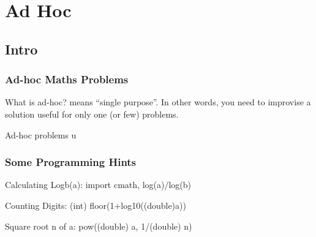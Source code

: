 \documentclass{beamer}
\begin{document}
\section{Ad Hoc}
\subsection{Intro}
\begin{frame}
  \frametitle{Ad-hoc Maths Problems}

  \begin{block}{What is ad-hoc?}
     means ``single purpose''. In other words, you 
    need to improvise a solution useful for only one (or few) problems.

    Ad-hoc problems u
    



  \end{block}






\end{frame}

\begin{frame}
  \frametitle{Some Programming Hints}

  Calculating Logb(a): import cmath, log(a)/log(b)

  Counting Digits: (int) floor(1+log10((double)a))

  Square root n of a: pow((double) a, 1/(double) n)
\end{frame}
\end{document}
